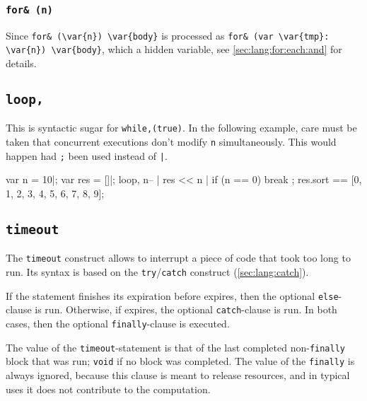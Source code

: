 \subsubsection{\lstinline{for& (n)}}

Since \lstinline|for& (\var{n}) \var{body}| is processed as
\lstinline|for& (var \var{tmp}: \var{n}) \var{body}|, which 
a hidden variable, see \autoref{sec:lang:for:each:and} for details.


\subsection{\lstinline{loop,}}
\experimentalremoved{}

This is syntactic sugar for \lstinline|while,(true)|.  In the following
example, care must be taken that concurrent executions don't modify
\lstinline{n} simultaneously.  This would happen had \lstinline|;| been used
instead of \lstinline'|'.

\begin{urbiassert}
{
  var n = 10|;
  var res = []|;
  loop,
  {
    n-- |
    res << n |
    if (n == 0)
      break
  };
  res.sort
}
==
[0, 1, 2, 3, 4, 5, 6, 7, 8, 9];
\end{urbiassert}

\subsection{\lstinline{timeout}}
\label{sec:lang:timeout}

The \lstinline{timeout} construct allows to interrupt a piece of code that
took too long to run.  Its syntax is based on the
\lstinline{try}/\lstinline{catch} construct (\autoref{sec:lang:catch}).


If the statement finishes its expiration before  expires, then
the optional \lstinline{else}-clause is run.  Otherwise, if 
expires, the optional \lstinline{catch}-clause is run.  In both cases, then
the optional \lstinline{finally}-clause is executed.

The value of the \lstinline{timeout}-statement is that of the last
completed non-\lstinline{finally} block that was run; \lstinline{void} if
no block was completed.  The value of the \lstinline{finally} is always
ignored, because this clause is meant to release resources, and in typical
uses it does not contribute to the computation.

